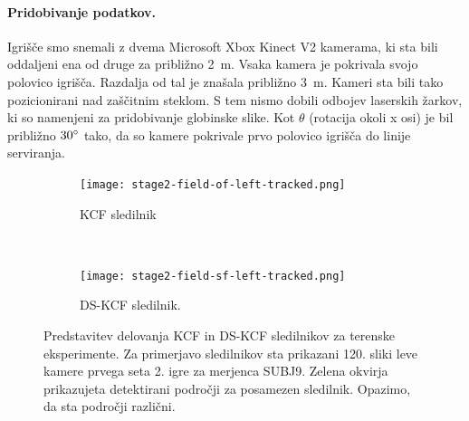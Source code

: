 \paragraph{Pridobivanje podatkov.}
Igrišče smo snemali z dvema Microsoft Xbox Kinect V2 kamerama, ki sta bili oddaljeni ena od druge za približno \SI{2}{m}. Vsaka kamera je pokrivala svojo polovico igrišča. Razdalja od tal je znašala približno \SI{3}{m}. Kameri sta bili tako pozicionirani nad zaščitnim steklom. S tem nismo dobili odbojev laserskih žarkov, ki so namenjeni za pridobivanje globinske slike. Kot $\theta$ (rotacija okoli x osi) je bil približno $30^\circ$ tako, da so kamere pokrivale prvo polovico igrišča do linije serviranja.

\begin{figure}[!htb]
	\centering
	\begin{subfigure}{0.45\columnwidth}
		\centering
		\texttt{[image: stage2-field-of-left-tracked.png]}
		\caption{KCF sledilnik}
	\end{subfigure}
	~
	\begin{subfigure}{0.45\columnwidth}
		\centering
		\texttt{[image: stage2-field-sf-left-tracked.png]}
		\caption{DS-KCF sledilnik.}
	\end{subfigure}
	\caption[Predstavitev delovanja KCF in DS-KCF sledilnikov za terenske eksperimente]{Predstavitev delovanja KCF in DS-KCF sledilnikov za terenske eksperimente. Za primerjavo sledilnikov sta prikazani 120. sliki leve kamere prvega seta 2. igre za merjenca SUBJ9. Zelena okvirja prikazujeta detektirani področji za posamezen sledilnik. Opazimo, da sta področji različni.}
	\label{fig:stage2-field-tracked}
\end{figure}



